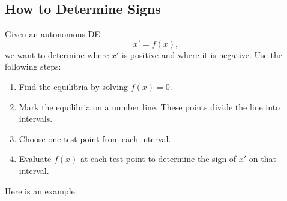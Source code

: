 \documentclass[10pt,letterpaper]{article}
\begin{document}

\subsection{How to Determine Signs}
Given an autonomous DE
\[
x' = f(x),
\]
we want to determine where $x'$ is positive and where it is negative. Use the following steps:
\begin{enumerate}
    \item Find the equilibria by solving $f(x)=0$.
    \item Mark the equilibria on a number line. These points divide the line into intervals.
    \item Choose one test point from each interval.
    \item Evaluate $f(x)$ at each test point to determine the sign of $x'$ on that interval.
\end{enumerate}
Here is an example.
\end{document}
